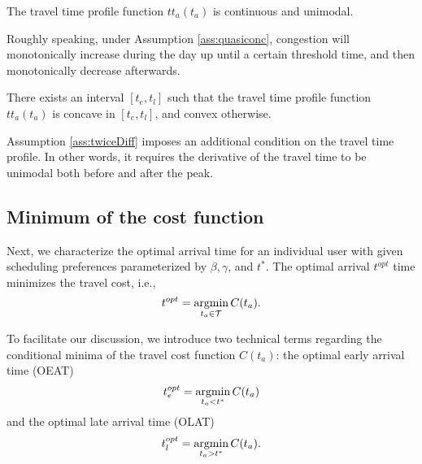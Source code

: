 \begin{assumption}\label{ass:quasiconc}
   The travel time profile function $tt_a(t_a)$ is continuous and unimodal. 
\end{assumption}

Roughly speaking, under Assumption \ref{ass:quasiconc}, congestion will monotonically increase during the day up until a certain threshold time, and then monotonically decrease afterwards.
 
\begin{assumption}\label{ass:twiceDiff}
  There exists an interval $[t_e, t_l]$ such that the travel time profile function $tt_a(t_a)$ is concave in $[t_e, t_l ]$, and convex otherwise. 
\end{assumption}

Assumption \ref{ass:twiceDiff} imposes an additional condition on the travel time profile. In other words, it requires the derivative of the travel time to be unimodal both before and after the peak.

\subsection{Minimum of the cost function}
\label{sec:cost_minima}

Next, we characterize the optimal arrival time for an individual user with given scheduling preferences parameterized by $\beta, \gamma$, and $t^*$.  The optimal arrival \(t^{opt}\) time minimizes the travel cost, i.e., 
    \begin{equation*}
      t^{opt} = \operatorname*{argmin}_{t_a \in \mathcal{T}}C(t_a).
    \end{equation*} 

To facilitate our discussion, we introduce two technical terms regarding the conditional minima of the travel cost function $C(t_a)$: the optimal early arrival time (OEAT) $$t_e^{opt}  = \operatorname*{argmin}_{t_a < t^*}C(t_a)$$ and the optimal late arrival time (OLAT)$$t_l^{opt} =  \operatorname*{argmin}_{t_a > t^*}C(t_a).$$ 

